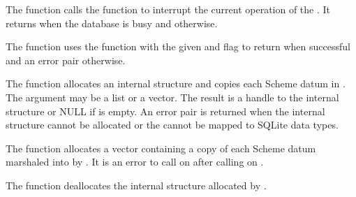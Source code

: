 \begin{function}
\end{function}

The  function calls the
 function to interrupt the current operation
of the . It returns  when the database is busy
and  otherwise.

\begin{function}
\end{function}

The  function uses the
 function with the given  and
 flag to return 
when successful and an error pair otherwise.

\begin{function}
\end{function}

The  function allocates an internal
structure and copies each Scheme datum in . The
 argument may be a list or a vector. The result is a
handle to the internal structure or NULL if  is empty.
An error pair is returned when the internal structure cannot be allocated or the
 cannot be mapped to SQLite data types.

\begin{function}
\end{function}

The  function allocates a vector
containing a copy of each Scheme datum marshaled into 
by .
It is an error to call  on 
after calling  on .

\begin{function}
\end{function}

The  function deallocates the internal
structure allocated by .

